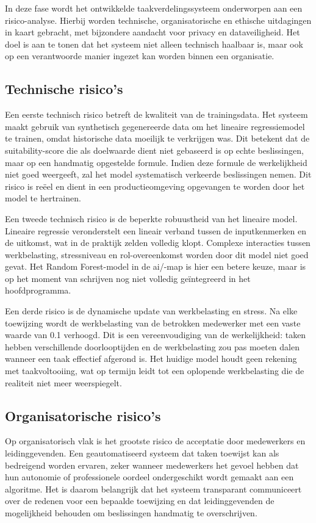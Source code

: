 \vspace{1em}In deze fase wordt het ontwikkelde taakverdelingssysteem onderworpen aan een risico-analyse. Hierbij worden technische, organisatorische en ethische uitdagingen in kaart gebracht, met bijzondere aandacht voor privacy en dataveiligheid. Het doel is aan te tonen dat het systeem niet alleen technisch haalbaar is, maar ook op een verantwoorde manier ingezet kan worden binnen een organisatie.

\subsection{Technische risico's}
Een eerste technisch risico betreft de kwaliteit van de trainingsdata. Het systeem maakt gebruik van synthetisch gegenereerde data om het lineaire regressiemodel te trainen, omdat historische data moeilijk te verkrijgen was. Dit betekent dat de suitability-score die als doelwaarde dient niet gebaseerd is op echte beslissingen, maar op een handmatig opgestelde formule. Indien deze formule de werkelijkheid niet goed weergeeft, zal het model systematisch verkeerde beslissingen nemen. Dit risico is reëel en dient in een productieomgeving opgevangen te worden door het model te hertrainen.

Een tweede technisch risico is de beperkte robuustheid van het lineaire model. Lineaire regressie veronderstelt een lineair verband tussen de inputkenmerken en de uitkomst, wat in de praktijk zelden volledig klopt. Complexe interacties tussen werkbelasting, stressniveau en rol-overeenkomst worden door dit model niet goed gevat. Het Random Forest-model in de ai/-map is hier een betere keuze, maar is op het moment van schrijven nog niet volledig geïntegreerd in het hoofdprogramma.

Een derde risico is de dynamische update van werkbelasting en stress. Na elke toewijzing wordt de werkbelasting van de betrokken medewerker met een vaste waarde van 0.1 verhoogd. Dit is een vereenvoudiging van de werkelijkheid: taken hebben verschillende doorlooptijden en de werkbelasting zou pas moeten dalen wanneer een taak effectief afgerond is. Het huidige model houdt geen rekening met taakvoltooiing, wat op termijn leidt tot een oplopende werkbelasting die de realiteit niet meer weerspiegelt.

\subsection{Organisatorische risico's}
Op organisatorisch vlak is het grootste risico de acceptatie door medewerkers en leidinggevenden. Een geautomatiseerd systeem dat taken toewijst kan als bedreigend worden ervaren, zeker wanneer medewerkers het gevoel hebben dat hun autonomie of professionele oordeel ondergeschikt wordt gemaakt aan een algoritme. Het is daarom belangrijk dat het systeem transparant communiceert over de redenen voor een bepaalde toewijzing en dat leidinggevenden de mogelijkheid behouden om beslissingen handmatig te overschrijven.

